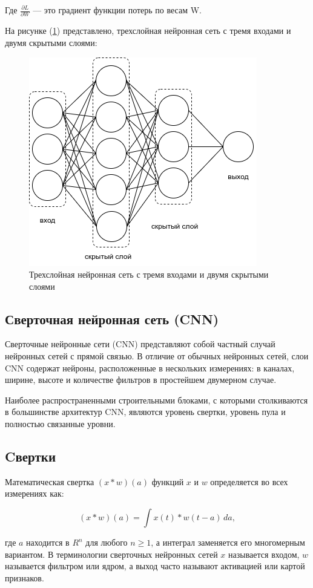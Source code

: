 Где \(\frac{\partial L}{\partial W}\) — это градиент функции потерь по весам W.

На рисунке (\ref{fig:neuron-arch}) представлено, трехслойная нейронная сеть с тремя входами и двумя скрытыми слоями: 
\begin{figure}[H]
	\centering
	\includegraphics[width=0.5\linewidth]{assets/neural-arch.png}
	\caption{Трехслойная нейронная сеть с тремя входами и двумя скрытыми слоями}
	\label{fig:neuron-arch}
\end{figure}

\subsection{Сверточная нейронная сеть (CNN)}

Сверточные нейронные сети (CNN) представляют собой частный случай нейронных сетей с прямой связью. В отличие от обычных нейронных сетей, слои CNN содержат нейроны, расположенные в нескольких измерениях: в каналах, ширине, высоте и количестве фильтров в простейшем двумерном случае.

Наиболее распространенными строительными блоками, с которыми столкиваются в большинстве архитектур CNN, являются уровень свертки, уровень пула и полностью связанные уровни.

\subsection*{Cвертки}

Математическая свертка \((x * w)(a)\) функций \(x\) и \(w\) определяется во всех измерениях как:

\begin{equation}
    (x * w)(a) = \int x(t) * w (t - a) \, da
, \end{equation}

где \(a\) находится в \(R^{n}\) для любого \(n \ge 1\), а интеграл заменяется его многомерным вариантом. В терминологии сверточных нейронных сетей \(x\) называется входом, \(w\) называется фильтром или ядром, а выход часто называют активацией или картой признаков.

